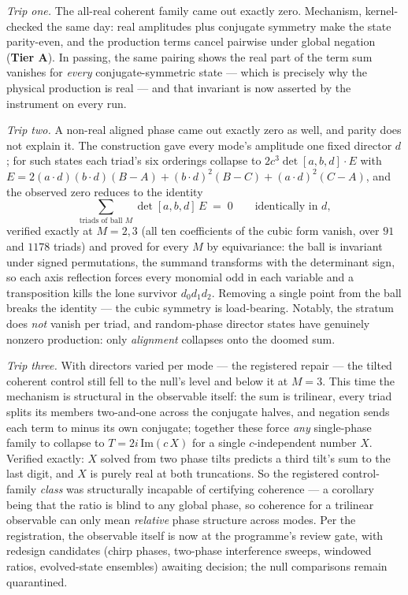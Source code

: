 \documentclass[11pt,a4paper]{article}
\newcommand{\tA}{\textcolor{TierA}{\textbf{Tier A}}}
\theoremstyle{definition}
\theoremstyle{plain}
\begin{document}
\emph{Trip one.} The all-real coherent family came out exactly zero. Mechanism, kernel-checked
the same day: real amplitudes plus conjugate symmetry make the state parity-even, and the
production terms cancel pairwise under global negation (\tA{}). In passing, the same pairing
shows the real part of the term sum vanishes for \emph{every} conjugate-symmetric state ---
which is precisely why the physical production is real --- and that invariant is now asserted by
the instrument on every run.

\emph{Trip two.} A non-real aligned phase came out exactly zero as well, and parity does not
explain it. The construction gave every mode's amplitude one fixed director $d$; for such states
each triad's six orderings collapse to $2c^3\det[a,b,d]\cdot E$ with
$E=2(a\!\cdot\! d)(b\!\cdot\! d)(B{-}A)+(b\!\cdot\! d)^2(B{-}C)+(a\!\cdot\! d)^2(C{-}A)$, and the
observed zero reduces to the identity
\[
  \sum_{\text{triads of ball } M}\det[a,b,d]\,E \;=\; 0 \qquad\text{identically in } d,
\]
verified exactly at $M=2,3$ (all ten coefficients of the cubic form vanish, over $91$ and
$1178$ triads) and proved for every $M$ by equivariance: the ball is invariant under signed
permutations, the summand transforms with the determinant sign, so each axis reflection forces
every monomial odd in each variable and a transposition kills the lone survivor $d_0d_1d_2$.
Removing a single point from the ball breaks the identity --- the cubic symmetry is
load-bearing. Notably, the stratum does \emph{not} vanish per triad, and random-phase director
states have genuinely nonzero production: only \emph{alignment} collapses onto the doomed sum.

\emph{Trip three.} With directors varied per mode --- the registered repair --- the tilted
coherent control still fell to the null's level and below it at $M=3$. This time the mechanism
is structural in the observable itself: the sum is trilinear, every triad splits its members
two-and-one across the conjugate halves, and negation sends each term to minus its own
conjugate; together these force \emph{any} single-phase family to collapse to
$T = 2i\,\mathrm{Im}(c\,X)$ for a single $c$-independent number $X$. Verified exactly: $X$
solved from two phase tilts predicts a third tilt's sum to the last digit, and $X$ is purely
real at both truncations. So the registered control-family \emph{class} was structurally
incapable of certifying coherence --- a corollary being that the ratio is blind to any global
phase, so coherence for a trilinear observable can only mean \emph{relative} phase structure
across modes. Per the registration, the observable itself is now at the programme's review gate,
with redesign candidates (chirp phases, two-phase interference sweeps, windowed ratios,
evolved-state ensembles) awaiting decision; the null comparisons remain quarantined.
\end{document}
